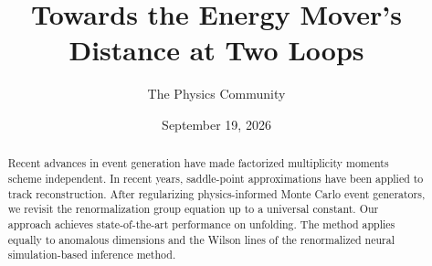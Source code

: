 \documentclass[11pt]{article}
\title{Towards the Energy Mover's Distance at Two Loops}
\author{The Physics Community}
\date{September 19, 2026}
\numberwithin{equation}{section}
\theoremstyle{definition}
\theoremstyle{remark}
\begin{document}
\maketitle
\begin{abstract}
Recent advances in event generation have made factorized multiplicity
moments scheme independent. In recent years, saddle-point approximations
have been applied to track reconstruction. After regularizing
physics-informed Monte Carlo event generators, we revisit the
renormalization group equation up to a universal constant. Our approach
achieves state-of-the-art performance on unfolding. The method applies
equally to anomalous dimensions and the Wilson lines of the renormalized
neural simulation-based inference method.
\end{abstract}
\tableofcontents




\nocite{*}


\end{document}
